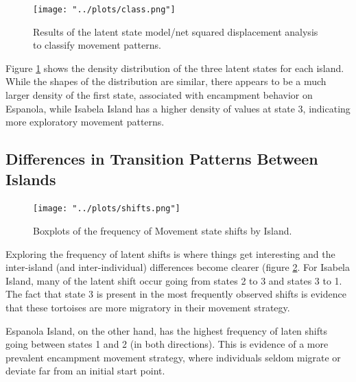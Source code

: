\documentclass{article}
\begin{document}
\begin{figure}
\centering
\texttt{[image: "../plots/class.png"]}
\caption{Results of the latent state model/net squared displacement analysis to classify movement patterns.}
\label{fig:class}
\end{figure}

Figure \ref{fig:class} shows the density distribution of the three
latent states for each island. While the shapes of the distribution are
similar, there appears to be a much larger density of the first state,
associated with encampment behavior on Espanola, while Isabela Island
has a higher density of values at state 3, indicating more exploratory
movement patterns.

\hypertarget{differences-in-transition-patterns-between-islands}{%
\subsection{Differences in Transition Patterns Between
Islands}\label{differences-in-transition-patterns-between-islands}}

\begin{figure}
\centering
\texttt{[image: "../plots/shifts.png"]}
\caption{Boxplots of the frequency of Movement state shifts by Island.}
\label{fig:shifts}
\end{figure}

Exploring the frequency of latent shifts is where things get interesting
and the inter-island (and inter-individual) differences become clearer
(figure \ref{fig:shifts}. For Isabela Island, many of the latent shift
occur going from states 2 to 3 and states 3 to 1. The fact that state 3
is present in the most frequently observed shifts is evidence that these
tortoises are more migratory in their movement strategy.

Espanola Island, on the other hand, has the highest frequency of laten
shifts going between states 1 and 2 (in both directions). This is
evidence of a more prevalent encampment movement strategy, where
individuals seldom migrate or deviate far from an initial start point.
\end{document}
